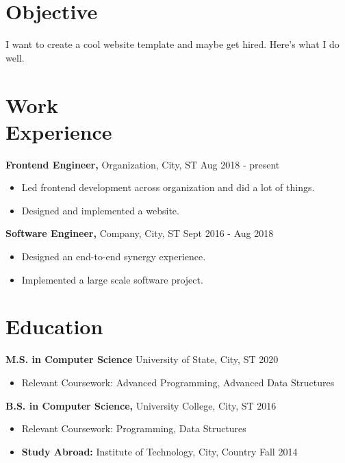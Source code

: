\documentclass[line, margin, 11pt]{res}
\begin{document}
 
\address{{\bf email@address.com / personalwebsite.io}}

\begin{resume} 
\vspace*{-14pt}
\section{Objective}
I want to create a cool website template and maybe get hired. Here's what I do well.

\section{Work \\ Experience}
{\bf Frontend Engineer,} Organization, City, ST \hfill Aug 2018 - present
        \vspace{4pt}
	\begin{itemize} \itemsep -2pt
	\item Led frontend development across organization and did a lot of things.
	\item Designed and implemented a website.
	\end{itemize}
	
{\bf Software Engineer,} Company, City, ST \hfill Sept 2016 - Aug 2018
        \vspace{4pt}
	\begin{itemize} \itemsep -2pt
	\item Designed an end-to-end synergy experience.
	\item Implemented a large scale software project.
	\end{itemize}

\section{Education} 
{\bf M.S. in Computer Science} University of State, City, ST \hfill 2020
        \vspace{4pt}
	\begin{itemize} \itemsep -2pt
        \item Relevant Coursework: Advanced Programming, Advanced Data Structures
	\end{itemize}
\vspace*{-8pt}
{\bf B.S. in Computer Science,} University College, City, ST \hfill 2016
        \vspace{4pt}
	\begin{itemize} \itemsep -2pt
	\item Relevant Coursework: Programming, Data Structures
	\item {\bf Study Abroad:} Institute of Technology, City, Country \hfill Fall 2014
	\end{itemize}


\end{resume}
\end{document}
